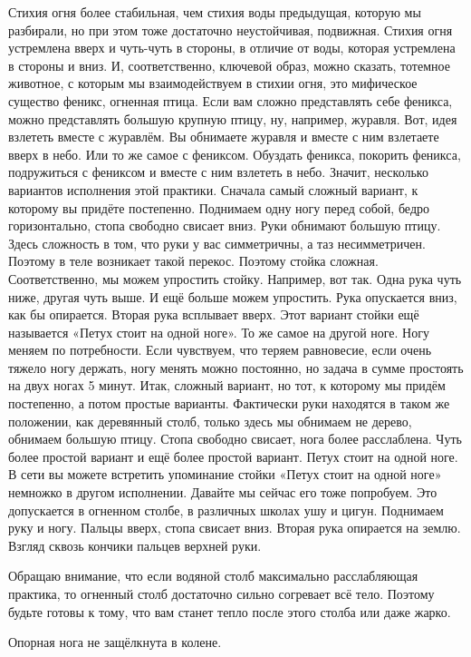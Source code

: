 Стихия огня более стабильная, чем стихия воды предыдущая, которую мы разбирали, но при этом
тоже достаточно неустойчивая, подвижная. Стихия огня устремлена вверх и чуть-чуть в стороны,
в отличие от воды, которая устремлена в стороны и вниз.
И, соответственно, ключевой образ, можно сказать, тотемное животное, с которым мы взаимодействуем
в стихии огня, это мифическое существо феникс, огненная птица. Если вам сложно представлять себе
феникса, можно представлять большую крупную птицу, ну, например, журавля. Вот, идея взлететь
вместе с журавлём. Вы обнимаете журавля и вместе с ним взлетаете вверх в небо. Или то же самое с
фениксом.
Обуздать феникса, покорить феникса, подружиться с фениксом и вместе с ним взлететь в небо.
Значит, несколько вариантов исполнения этой практики. Сначала самый сложный вариант, к которому
вы придёте постепенно. Поднимаем одну ногу перед собой, бедро горизонтально, стопа свободно
свисает вниз.
Руки обнимают большую птицу. Здесь сложность в том, что руки у вас симметричны, а таз
несимметричен. Поэтому в теле возникает такой перекос. Поэтому стойка сложная. Соответственно,
мы можем упростить стойку. Например, вот так. Одна рука чуть ниже, другая чуть выше.
И ещё больше можем упростить. Рука опускается вниз, как бы опирается. Вторая рука всплывает
вверх. Этот вариант стойки ещё называется «Петух стоит на одной ноге». То же самое на другой ноге.
Ногу меняем по потребности. Если чувствуем, что теряем равновесие, если очень тяжело ногу держать,
ногу менять можно постоянно, но задача в сумме простоять на двух ногах 5 минут. Итак, сложный
вариант, но тот, к которому мы придём постепенно, а потом простые варианты.
Фактически руки находятся в таком же положении, как деревянный столб, только здесь мы обнимаем
не дерево, обнимаем большую птицу. Стопа свободно свисает, нога более расслаблена. Чуть более
простой вариант и ещё более простой вариант. Петух стоит на одной ноге. В сети вы можете встретить
упоминание стойки «Петух стоит на одной ноге» немножко в другом исполнении. Давайте мы сейчас его
тоже попробуем. Это допускается в огненном столбе, в различных школах ушу и цигун.
Поднимаем руку и ногу. Пальцы вверх, стопа свисает вниз. Вторая рука опирается на землю. Взгляд
сквозь кончики пальцев верхней руки.

Обращаю внимание, что если водяной столб максимально расслабляющая практика, то
огненный столб достаточно сильно согревает всё тело. Поэтому будьте готовы к тому, что вам станет
тепло после этого столба или даже жарко.

Опорная нога не защёлкнута в колене.

